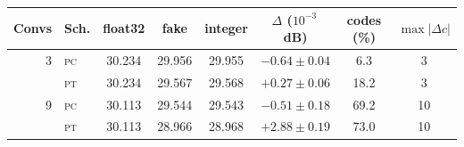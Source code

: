 \setlength{\tabcolsep}{4pt}
\begin{tabular}{rlcccccc}
\toprule
Convs & Sch. & float32 & fake & integer & $\Delta$ ($10^{-3}$\,dB) & codes (\%) & $\max|\Delta c|$ \\
\midrule
3 & \textsc{pc} & 30.234 & 29.956 & 29.955 & $-0.64\pm0.04$ & 6.3 & 3 \\
 & \textsc{pt} & 30.234 & 29.567 & 29.568 & $+0.27\pm0.06$ & 18.2 & 3 \\
\midrule
9 & \textsc{pc} & 30.113 & 29.544 & 29.543 & $-0.51\pm0.18$ & 69.2 & 10 \\
 & \textsc{pt} & 30.113 & 28.966 & 28.968 & $+2.88\pm0.19$ & 73.0 & 10 \\
\bottomrule
\end{tabular}
